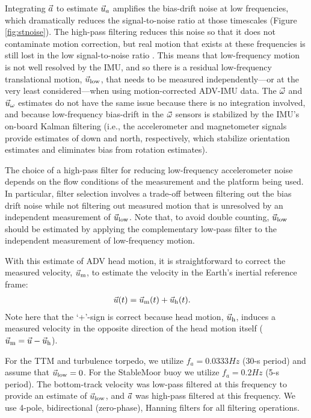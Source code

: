 Integrating ${\vec{a}}$ to estimate $\vec{u}_a$ amplifies the bias-drift noise at low frequencies, which dramatically reduces the signal-to-noise ratio at those timescales (Figure \ref{fig:stnoise}).  The high-pass filtering reduces this noise so that it does not contaminate motion correction, but real motion that exists at these frequencies is still lost in the low signal-to-noise ratio \cite[]{EgelandPhD2014, VanZwieten++2015}. This means that low-frequency motion is not well resolved by the IMU, and so there is a residual low-frequency translational motion, $\vec{u}_\mathrm{low}$, that needs to be measured independently---or at the very least considered---when using motion-corrected ADV-IMU data. The $\vec{\omega}$ and $\vec{u}_\omega$ estimates do not have the same issue because there is no integration involved, and because low-frequency bias-drift in the $\vec{\omega}$ sensors is stabilized by the IMU's on-board Kalman filtering (i.e., the accelerometer and magnetometer signals provide estimates of down and north, respectively, which stabilize orientation estimates and eliminates bias from rotation estimates).

The choice of a high-pass filter for reducing low-frequency accelerometer noise depends on the flow conditions of the measurement and the platform being used. In particular, filter selection involves a trade-off between filtering out the bias drift noise while not filtering out measured motion that is unresolved by an independent measurement of $\vec{u}_\mathrm{low}$. Note that, to avoid double counting, $\vec{u}_\mathrm{low}$ should be estimated by applying the complementary low-pass filter to the independent measurement of low-frequency motion.

With this estimate of ADV head motion, it is straightforward to correct the measured velocity, $\vec{u}_\mathrm{m}$, to estimate the velocity in the Earth's inertial reference frame:
\begin{align}
  \label{eqn:u_mot_def}
  \vec{u}(t) & = \vec{u}_\mathrm{m}(t) + \vec{u}_\mathrm{h}(t).
\end{align}
Note here that the `+'-sign is correct because head motion, $\vec{u}_\mathrm{h}$, induces a measured velocity in the opposite direction of the head motion itself ($\vec{u}_\mathrm{m} = \vec{u} - \vec{u}_\mathrm{h}$).

For the TTM and turbulence torpedo, we utilize $f_a = 0.0333 Hz$ (30-s period) and assume that $\vec{u}_\mathrm{low} = 0$. For the StableMoor buoy we utilize $f_a = 0.2 Hz$ (5-s
period). The bottom-track velocity was low-pass filtered at this frequency to provide an estimate of $\vec{u}_\mathrm{low}$, and ${\vec{a}}$ was high-pass filtered at this frequency. We use 4-pole, bidirectional (zero-phase), Hanning filters for all filtering operations. 

